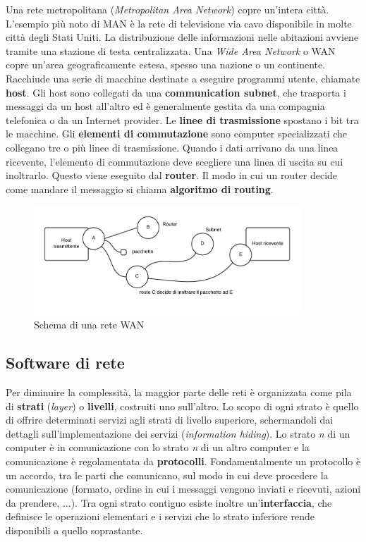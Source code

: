Una rete metropolitana (\textit{Metropolitan Area Network}) copre un'intera città. L'esempio più noto di MAN è la rete di televisione via cavo disponibile in molte città degli Stati Uniti. La distribuzione delle informazioni nelle abitazioni avviene tramite una stazione di testa centralizzata.
\linebreak
\linebreak
Una \textit{Wide Area Network} o WAN copre un'area geograficamente estesa, spesso una nazione o un continente. Racchiude una serie di macchine destinate a eseguire programmi utente, chiamate \textbf{host}. Gli host sono collegati da una \textbf{communication subnet}, che trasporta i messaggi da un host all'altro ed è generalmente gestita da una compagnia telefonica o da un Internet provider. Le \textbf{linee di trasmissione} spostano i bit tra le macchine. Gli \textbf{elementi di commutazione} sono computer specializzati che collegano tre o più linee di trasmissione. Quando i dati arrivano da una linea ricevente, l'elemento di commutazione deve scegliere una linea di uscita su cui inoltrarlo. Questo viene eseguito dal \textbf{router}. Il modo in cui un router decide come mandare il messaggio si chiama \textbf{algoritmo di routing}.

\begin{figure}[htbp]
\centering
\includegraphics[width=100mm]{images/wan.png}
\caption{Schema di una rete WAN}
\end{figure}

\subsection{Software di rete}

Per diminuire la complessità, la maggior parte delle reti è organizzata come pila di \textbf{strati} (\textit{layer}) o \textbf{livelli}, costruiti uno sull'altro. Lo scopo di ogni strato è quello di offrire determinati servizi agli strati di livello superiore, schermandoli dai dettagli sull'implementazione dei servizi (\textit{information hiding}).
Lo strato \textit{n} di un computer è in comunicazione con lo strato \textit{n} di un altro computer e la comunicazione è regolamentata da \textbf{protocolli}. Fondamentalmente un protocollo è un accordo, tra le parti che comunicano, sul modo in cui deve procedere la comunicazione (formato, ordine in cui i messaggi vengono inviati e ricevuti, azioni da prendere, ...). 
Tra ogni strato contiguo esiste inoltre un'\textbf{interfaccia}, che definisce le operazioni elementari e i servizi che lo strato inferiore rende disponibili a quello soprastante.

